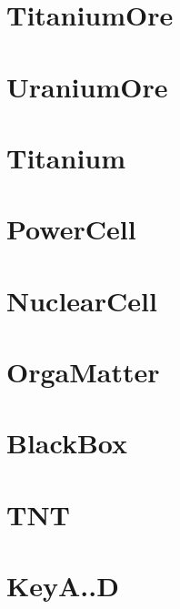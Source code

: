 \section{TitaniumOre}
\section{UraniumOre}
\section{Titanium}
\section{PowerCell}
\section{NuclearCell}
\section{OrgaMatter}
\section{BlackBox}
\section{TNT}
\section{KeyA..D}